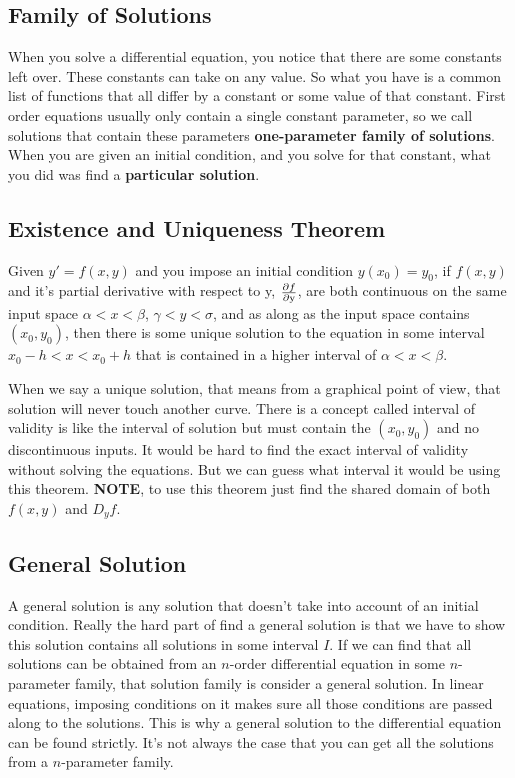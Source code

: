 \subsection{Family of Solutions}
When you solve a differential equation, you notice that there are some constants left over. These constants can take on any value. So what you have is a common list of functions that all differ by a constant or some value of that constant. First order equations usually only contain a single constant parameter, so we call solutions that contain these parameters \textbf{one-parameter family of solutions}. When you are given an initial condition, and you solve for that constant, what you did was find a \textbf{particular solution}.
\subsection{Existence and Uniqueness Theorem}
Given $y'=f(x,y)$ and you impose an initial condition $y(x_0) = y_0$, if $f(x,y)$ and it's partial derivative with respect to y, $\frac{\partial f}{\partial\mathrm{y}}$, are both continuous on the same input space $\alpha < x < \beta$, $\gamma < y < \sigma$, and as along as the input space contains $(x_0, y_0)$, then there is some unique solution to the equation in some interval $x_0 - h < x < x_0 + h$ that is contained in a higher interval of $\alpha < x < \beta$. 

When we say a unique solution, that means from a graphical point of view, that solution will never touch another curve. There is a concept called interval of validity is like the interval of solution but must contain the $(x_0, y_0)$ and no discontinuous inputs. It would be hard to find the exact interval of validity without solving the equations. But we can guess what interval it would be using this theorem. \textbf{NOTE}, to use this theorem just find the shared domain of both $f(x,y)$ and $D_y f$.

\subsection{General Solution}
A general solution is any solution that doesn't take into account of an initial condition. Really the hard part of find a general solution is that we have to show this solution contains all solutions in some interval $I$. If we can find that all solutions can be obtained from an $n$-order differential equation in some $n$-parameter family, that solution family is consider a general solution. In linear equations, imposing conditions on it makes sure all those conditions are passed along to the solutions. This is why a general solution to the differential equation can be found strictly. It's not always the case that you can get all the solutions from a $n$-parameter family. 

